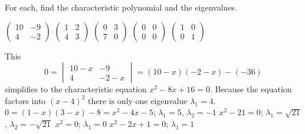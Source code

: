 \begin{exercises}
  \item 
    For each, find the characteristic polynomial and the eigenvalues.
    \begin{exparts*}
      \partsitem \( \begin{pmatrix}
                 10  &-9 \\
                  4  &-2
            \end{pmatrix}  \)
      \partsitem $\begin{pmatrix}
                    1  &2  \\
                    4  &3  
                 \end{pmatrix}$
      \partsitem \( \begin{pmatrix}
                  0  &3  \\
                  7 &0
                 \end{pmatrix} \)
      \partsitem \( \begin{pmatrix}  
                  0  &0  \\
                  0  &0
            \end{pmatrix}  \)
      \partsitem \( \begin{pmatrix}
                  1  &0  \\
                  0  &1
            \end{pmatrix}  \)
    \end{exparts*}
    \begin{answer}
      \begin{exparts}
         \partsitem This
           \begin{equation*}
             0=
             \begin{vmatrix}
               10-x  &-9  \\
               4     &-2-x
             \end{vmatrix}
             =(10-x)(-2-x)-(-36)
           \end{equation*}
           simplifies to the characteristic equation \( x^2-8x+16=0 \). 
           Because the equation factors into $(x-4)^2$ there is
           only one eigenvalue \( \lambda_1=4 \).
         \partsitem $0=(1-x)(3-x)-8=x^2-4x-5$; $\lambda_1=5$, $\lambda_2=-1$
         \partsitem \( x^2-21=0 \); 
           \( \lambda_1=\sqrt{21} \), $\lambda_2=-\sqrt{21}$
         \partsitem \( x^2=0 \); \( \lambda_1=0 \)
         \partsitem \( x^2-2x+1=0 \); \( \lambda_1=1 \)
       \end{exparts}  
     \end{answer}

\end{exercises}
